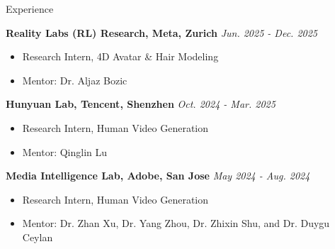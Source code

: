 \documentclass{resume} %
\begin{document}
\begin{rSection}{Experience}

{\bf Reality Labs (RL) Research, Meta, Zurich} \hfill {\em Jun. 2025 - Dec. 2025}
\begin{itemize}[leftmargin=18pt]
    \setlength{\itemsep}{-5pt}
    \item Research Intern, 4D Avatar \& Hair Modeling
    \item Mentor: Dr. Aljaz Bozic
\end{itemize}

{\bf Hunyuan Lab, Tencent, Shenzhen} \hfill {\em Oct. 2024 - Mar. 2025}
\begin{itemize}[leftmargin=18pt]
    \setlength{\itemsep}{-5pt}
    \item Research Intern, Human Video Generation
    \item Mentor: Qinglin Lu
\end{itemize}

{\bf Media Intelligence Lab, Adobe, San Jose} \hfill {\em May 2024 - Aug. 2024}
\begin{itemize}[leftmargin=18pt]
    \setlength{\itemsep}{-5pt}
    \item Research Intern, Human Video Generation
    \item Mentor: Dr. Zhan Xu, Dr. Yang Zhou, Dr. Zhixin Shu, and Dr. Duygu Ceylan
\end{itemize}



\end{rSection}
\end{document}
